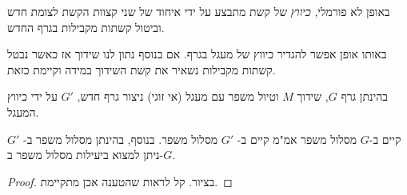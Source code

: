 באופן לא פורמלי,
\emph{כיווץ}
של קשת מתבצע על ידי איחוד של שני קצוות הקשת לצומת חדש וביטול קשתות מקבילות בגרף החדש.

באותו אופן אפשר להגדיר כיווץ של מעגל בגרף.
אם בנוסף נתון לנו שידוך אז כאשר נבטל קשתות מקבילות נשאיר את קשת השידוך במידה וקיימת כזאת.

בהינתן גרף $G$, שידוך $M$ וטיול משפר עם מעגל (אי זוגי) ניצור גרף חדש, 
$G'$
על ידי כיווץ המעגל.
\begin{claim}
קיים ב-$G$ מסלול משפר אמ"מ קיים ב-
$G'$
מסלול משפר.
בנוסף, בהינתן מסלול משפר ב-
$G'$
ניתן למצוא ביעילות מסלול משפר ב-$G$.
\end{claim}

\begin{proof}
בציור. קל לראות שהטענה אכן מתקיימת.
\end{proof}

\begin{figure}[h]
\centering

\end{figure}
